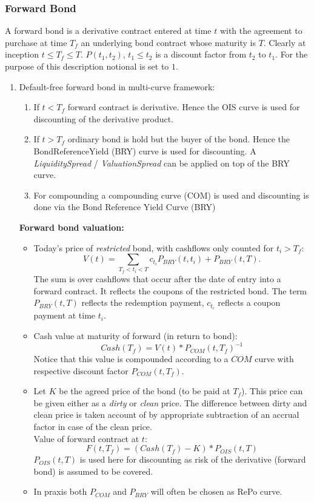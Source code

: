 \subsubsection{Forward Bond} \label{forwardBond}


A forward bond is a derivative contract entered at time $t$ with the agreement to purchase at time $T_f$ an underlying bond contract whose maturity is $T$. Clearly at inception $t\leq T_f\leq T$. $P(t_1,t_2)$, $t_1\leq t_2$ is a discount factor from $t_2$ to $t_1$. For the purpose of this description notional is set to $1$.

\begin{enumerate}
\item Default-free forward bond in multi-curve framework:

\begin{enumerate}
	\item If $t<T_f$ forward contract is derivative. Hence the OIS curve is used for discounting of the derivative product.
	\item If $t>T_f$ ordinary bond is hold but the buyer of the bond. Hence the BondReferenceYield (BRY) curve is used for discounting. A \emph{LiquiditySpread} / \emph{ValuationSpread} can be applied on top of the BRY curve.
	\item  For compounding a compounding curve (COM) is used and discounting is done via the Bond Reference Yield Curve (BRY)
\end{enumerate}
\textbf{Forward bond valuation:}
\begin{itemize}
	\item Today's price of \emph{restricted} bond, with cashflows only counted for $t_i>T_f$:
	$$V(t)=\sum_{ T_f<t_i<T}c_{t_i}{P_{BRY}}(t,t_i)+P_{BRY}(t,T).$$
	The sum is over cashflows that occur after the date of entry into a forward contract. It reflects the coupons of the restricted bond. The term $P_{BRY}(t,T)$ reflects the redemption payment, $c_{t_i}$ reflects a coupon payment at time $t_i$.
	\item Cash value at maturity of forward (in return to bond):
	$$Cash(T_f)=V(t)*P_{COM}(t,T_f)^{-1}$$
	Notice that this value is compounded  according to a $COM$ curve with respective discount factor $P_{COM}(t,T_f)$.
	\item Let $K$ be the agreed price of the bond (to be paid at $T_f$). This price can be given either as a \emph{dirty} or \emph{clean} price. The difference between dirty and clean price is taken account of by appropriate subtraction of an accrual factor in case of the clean price.\\
	Value of forward contract at $t$:
	$$F(t,T_f)=\left(Cash(T_f)-K\right)*P_{OIS}(t,T)$$
	$P_{OIS}(t,T)$ is used here for discounting as risk of the derivative (forward bond) is assumed to be covered.
	\item In praxis both $P_{COM}$ and $P_{BRY}$ will often be chosen as RePo curve.
\end{itemize}


\end{enumerate}

